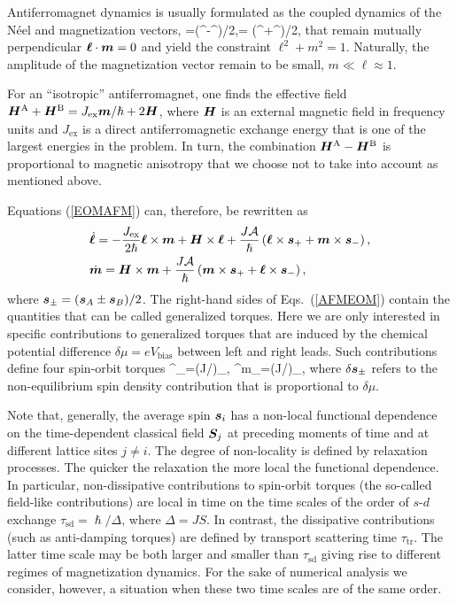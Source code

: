 Antiferromagnet dynamics is usually formulated as the coupled dynamics of the N\'eel and magnetization vectors,
\be
\bb{\ell}=\lt(^-^\rt)/2,\qquad {}= \lt(^+^\rt)/2,
\e
that remain mutually perpendicular $\boldsymbol{\ell}\cdot \boldsymbol{m}=0$ and yield the constraint $\ell^2+m^2=1$. Naturally, the amplitude of the magnetization vector remain to be small, $m\ll \ell \approx 1$.

For an ``isotropic'' antiferromagnet, one finds the effective field \cite{Gomonay2014} $\boldsymbol{H}^\text{A}+\boldsymbol{H}^\text{B}= J_\text{ex}\boldsymbol{m}/\hslash+2\boldsymbol{H}$, where $\boldsymbol{H}$ is an external magnetic field in frequency units and $J_\text{ex}$ is a direct antiferromagnetic exchange energy that is one of the largest energies in the problem. In turn, the combination $\boldsymbol{H}^\text{A}-\boldsymbol{H}^\text{B}$ is proportional to magnetic anisotropy that we choose not to take into account as mentioned above.  

Equations (\ref{EOMAFM}) can, therefore, be rewritten as
\begin{align}
&\dot{\boldsymbol{\ell}} = -\frac{J_\text{ex}}{2\hslash} \boldsymbol{\ell}\times\boldsymbol{m} +\boldsymbol{H}\times\boldsymbol{\ell}+\frac{J\mathcal{A}}{\hslash}\left(\boldsymbol{\ell}\times\boldsymbol{s}_++\boldsymbol{m}\times\boldsymbol{s}_-\right),\nonumber\\
&\dot{\boldsymbol{m}} = \boldsymbol{H}\times\boldsymbol{m}+\frac{J\mathcal{A}}{\hslash}\left(\boldsymbol{m}\times\boldsymbol{s}_++\boldsymbol{\ell}\times\boldsymbol{s}_-\right),
\label{AFMEOM}
\end{align}
where $\boldsymbol{s}_\pm=(\boldsymbol{s}_A\pm\boldsymbol{s}_B)/2$. The right-hand sides of Eqs.~(\ref{AFMEOM}) contain the quantities that can be called generalized torques. Here we are only interested in specific contributions to generalized torques that are induced by the chemical potential difference $\delta\mu=eV_\text{bias}$ between left and right leads. Such contributions define four spin-orbit torques  
\be
\label{SOT_def}
^\ell_\pm=(J/\hslash)\bb{\ell}\times\delta{}_\pm, \quad 
{}^m_\pm=(J/\hslash)\times\delta{}_\pm,
\e
where $\delta \boldsymbol{s}_\pm$ refers to the non-equilibrium spin density contribution that is proportional to $\delta\mu$. 

Note that, generally, the average spin $\boldsymbol{s}_i$ has a non-local functional dependence on the time-dependent classical field $\boldsymbol{S}_j$ at preceding moments of time  and at different lattice sites $j\neq i$. The degree of non-locality is defined by relaxation processes. The quicker the relaxation the more local the functional dependence. In particular, non-dissipative contributions to spin-orbit torques (the so-called field-like contributions) are local in time on the time scales of the order of $s$-$d$ exchange  $\tau_\text{sd}=\hslash/\Delta$, where $\Delta=J S$. In contrast, the dissipative contributions (such as anti-damping torques) are defined by transport scattering time $\tau_\text{tr}$. The latter time scale may be both larger and smaller than $\tau_\text{sd}$ giving rise to different regimes of magnetization dynamics. For the sake of numerical analysis we consider, however, a situation when these two time scales are of the same order.

